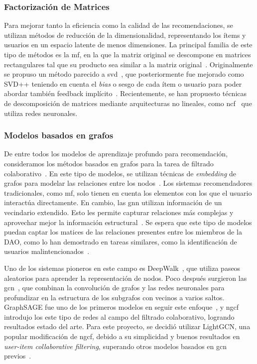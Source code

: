 \subsubsection{Factorización de Matrices}

Para mejorar tanto la eficiencia como la calidad de las recomendaciones, se utilizan métodos de reducción de la dimensionalidad, representando los ítems y usuarios en un espacio latente de menos dimensiones. La principal familia de este tipo de métodos es la \gls{mf}, en la que la matriz original se descompone en matrices rectangulares tal que su producto sea similar a la matriz original~\cite{koren_matrix_2009}. Originalmente se propuso un método parecido a \gls{svd}~\cite{funk_netflix_2006}, que posteriormente fue mejorado como SVD++ teniendo en cuenta el \textit{bias} o sesgo de cada ítem o usuario para poder abordar también feedback implícito~\cite{koren_factor_2010}. Recientemente, se han propuesto técnicas de descomposición de matrices mediante arquitecturas no lineales, como \gls{ncf}~\cite{he_neural_2017} que utiliza redes neuronales.

\subsubsection{Modelos basados en grafos}

De entre todos los modelos de aprendizaje profundo para recomendación, consideramos los métodos basados en grafos para la tarea de filtrado colaborativo~\cite{wu_graph_2022}. En este tipo de modelos, se utilizan técnicas de \textit{embedding} de grafos para modelar las relaciones entre los nodos~\cite{wang_graph_2020}.
Los sistemas recomendadores tradicionales, como \gls{mf}, solo tienen en cuenta los elementos con los que el usuario interactúa directamente. En cambio, las \gls{gnn} utilizan información de un vecindario extendido. Esto les permite capturar relaciones más complejas y aprovechar mejor la información estructural~\cite{gao_survey_2023}. Se espera que este tipo de modelos puedan captar los matices de las relaciones presentes entre los miembros de la DAO, como lo han demostrado en tareas similares, como la identificación de usuarios malintencionados~\cite{dupont_new_2024}.

Uno de los sistemas pioneros en este campo es DeepWalk~\cite{perozzi_deepwalk_2014}, que utiliza paseos aleatorios para aprender la representación de nodos. 
Poco después surgieron las \acrfull{gcn}~\cite{duvenaud_convolutional_2015}, que combinan la convolución de grafos y las redes neuronales para profundizar en la estructura de los subgrafos con vecinos a varios saltos. GraphSAGE fue uno de los primeros modelos en seguir este enfoque~\cite{hamilton_inductive_2017}, y \gls{ngcf}~\cite{wang_neural_2019} introdujo los este tipo de redes al campo del filtrado colaborativo, logrando resultados estado del arte.
Para este proyecto, se decidió utilizar LightGCN, una popular modificación de \gls{ngcf}, debido a su simplicidad y buenos resultados en \textit{user-item collaborative filtering}, superando otros modelos basados en \gls{gcn} previos~\cite{he_lightgcn_2020}.

